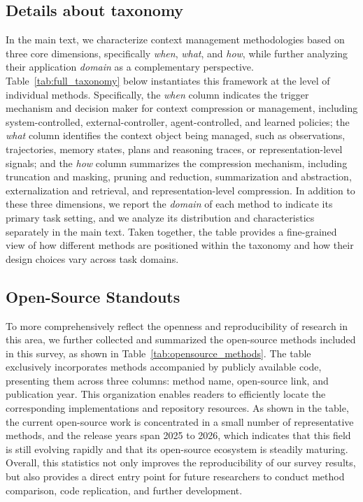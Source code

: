 \subsection{Details about taxonomy}
\label{ap:details_about_taxonomy}
In the main text, we characterize context management methodologies based on three core dimensions, specifically \textit{when}, \textit{what}, and \textit{how}, while further analyzing their application \textit{domain} as a complementary perspective. Table~\ref{tab:full_taxonomy} below instantiates this framework at the level of individual methods. Specifically, the \textit{when} column indicates the trigger mechanism and decision maker for context compression or management, including system-controlled, external-controller, agent-controlled, and learned policies; the \textit{what} column identifies the context object being managed, such as observations, trajectories, memory states, plans and reasoning traces, or representation-level signals; and the \textit{how} column summarizes the compression mechanism, including truncation and masking, pruning and reduction, summarization and abstraction, externalization and retrieval, and representation-level compression. In addition to these three dimensions, we report the \textit{domain} of each method to indicate its primary task setting, and we analyze its distribution and characteristics separately in the main text. Taken together, the table provides a fine-grained view of how different methods are positioned within the taxonomy and how their design choices vary across task domains.

\subsection{Open-Source Standouts}
\label{ap:open_source_standouts}
To more comprehensively reflect the openness and reproducibility of research in this area, we further collected and summarized the open-source methods included in this survey, as shown in Table~\ref{tab:opensource_methods}. The table exclusively incorporates methods accompanied by publicly available code, presenting them across three columns: method name, open-source link, and publication year. This organization enables readers to efficiently locate the corresponding implementations and repository resources. As shown in the table, the current open-source work is concentrated in a small number of representative methods, and the release years span 2025 to 2026, which indicates that this field is still evolving rapidly and that its open-source ecosystem is steadily maturing. Overall, this statistics not only improves the reproducibility of our survey results, but also provides a direct entry point for future researchers to conduct method comparison, code replication, and further development.

